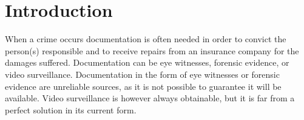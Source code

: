 \chapter{Introduction}
\label{chap:introduction}


When a crime occurs documentation is often needed in order to convict the person(s) responsible and to receive repairs from an insurance company for the damages suffered.
Documentation can be eye witnesses, forensic evidence, or video surveillance.
Documentation in the form of eye witnesses or forensic evidence are unreliable sources, as it is not possible to guarantee it will be available.
Video surveillance is however always obtainable, but it is far from a perfect solution in its current form.





